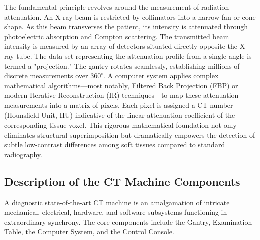 The fundamental principle revolves around the measurement of radiation attenuation. An X-ray beam is restricted by collimators into a narrow fan or cone shape. As this beam transverses the patient, its intensity is attenuated through photoelectric absorption and Compton scattering. The transmitted beam intensity is measured by an array of detectors situated directly opposite the X-ray tube. The data set representing the attenuation profile from a single angle is termed a "projection." The gantry rotates seamlessly, establishing millions of discrete measurements over $360^\circ$. A computer system applies complex mathematical algorithms—most notably, Filtered Back Projection (FBP) or modern Iterative Reconstruction (IR) techniques—to map these attenuation measurements into a matrix of pixels. Each pixel is assigned a CT number (Hounsfield Unit, HU) indicative of the linear attenuation coefficient of the corresponding tissue voxel. This rigorous mathematical foundation not only eliminates structural superimposition but dramatically empowers the detection of subtle low-contrast differences among soft tissues compared to standard radiography.

\subsection{Description of the CT Machine Components}
A diagnostic state-of-the-art CT machine is an amalgamation of intricate mechanical, electrical, hardware, and software subsystems functioning in extraordinary synchrony. The core components include the Gantry, Examination Table, the Computer System, and the Control Console.

